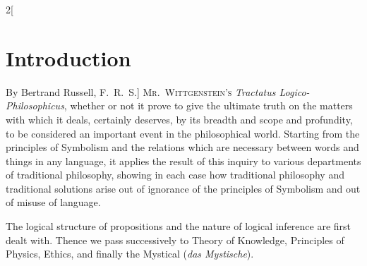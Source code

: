 \documentclass[oneside,openany,12pt]{book}
\begin{document}
\begin{multicols}{2}[\section*{Introduction}By Bertrand Russell, F.\ R.\ S.]
\noindent%
\textsc{Mr.\ Wittgenstein's} \emph{Tractatus Logico-Phil\-o\-soph\-i\-cus}, whether or not it prove to give the ultimate truth on the matters with which it deals, certainly deserves, by its breadth and scope and profundity, to be considered an important event in the philosophical world. Starting from the principles of Symbolism and the relations which are necessary between words and things in any language, it applies the result of this inquiry to various departments of traditional philosophy, showing in each case how traditional philosophy and traditional solutions arise out of ignorance of the principles of Symbolism and out of misuse of language.

The logical structure of propositions and the nature of logical inference are first dealt with. Thence we pass successively to Theory of Knowledge, Principles of Physics, Ethics, and finally the Mystical (\emph{das Mystische}).


\end{multicols}
\end{document}

